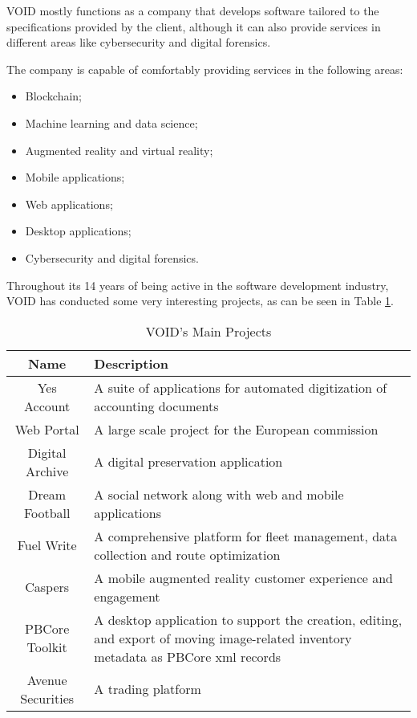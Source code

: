 VOID mostly functions as a company that develops software tailored to the specifications provided by the client, although 
it can also provide services in different areas like cybersecurity and digital forensics.

The company is capable of comfortably providing services in the following areas:
\begin{itemize}
 \item Blockchain;
 \item Machine learning and data science;
 \item Augmented reality and virtual reality;
 \item Mobile applications;
 \item Web applications;
 \item Desktop applications;
 \item Cybersecurity and digital forensics.
\end{itemize}

Throughout its 14 years of being active in the software development industry, VOID has conducted some very interesting projects, as can be seen in Table \ref{tab:voidProjects}.

\begin{table}[ht]
  \begin{tabularx}{\textwidth}{@{}|c| *1{>{\centering\arraybackslash}X}@{}|}
    \hline
    \textbf{Name} & \textbf{Description} \\
    \hline\hline
    Yes Account & A suite of applications for automated digitization of accounting documents \\
    \hline
    Web Portal & A large scale project for the European commission \\
    \hline
    Digital Archive & A digital preservation application \\
    \hline
    Dream Football & A social network along with web and mobile applications  \\
    \hline
    Fuel Write & A comprehensive platform for fleet management, data collection and route optimization \\
    \hline
    Caspers & A mobile augmented reality customer experience and engagement \\
    \hline
    PBCore Toolkit & A desktop application to support the creation, editing, and export of moving image-related inventory metadata as PBCore \acrshort{xml} records \\
    \hline
    Avenue Securities & A trading platform \\
    \hline
  \end{tabularx}
  \caption{VOID's Main Projects}
  \label{tab:voidProjects}
\end{table}

